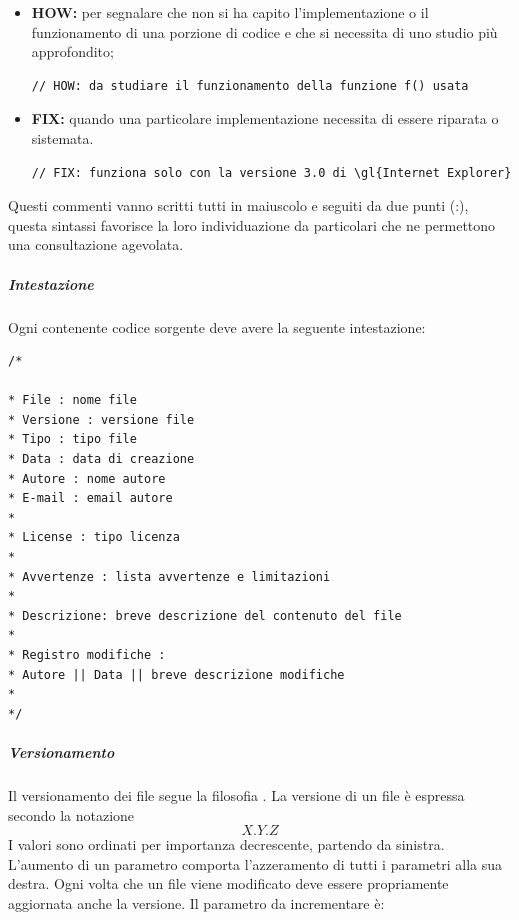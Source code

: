 \begin{itemize}
\begin{itemize}
				\item \textbf{HOW:} per segnalare che non si ha capito l'implementazione o il funzionamento di una porzione di codice e che si necessita di uno studio più approfondito;
				\begin{lstlisting}
// HOW: da studiare il funzionamento della funzione f() usata
				\end{lstlisting}
				
				\item \textbf{FIX:} quando una particolare implementazione necessita di essere riparata o sistemata.
				\begin{lstlisting}
// FIX: funziona solo con la versione 3.0 di \gl{Internet Explorer}
				\end{lstlisting}
			\end{itemize}
			Questi commenti vanno scritti tutti in maiuscolo e seguiti da due punti (:), questa sintassi favorisce la loro individuazione da particolari  che ne permettono una consultazione agevolata.
			
			\end{itemize}
			\subparagraph{Intestazione} \Spazio
			Ogni  contenente codice sorgente deve avere la seguente intestazione:
			\begin{lstlisting}
/*

* File : nome file
* Versione : versione file
* Tipo : tipo file
* Data : data di creazione
* Autore : nome autore 
* E-mail : email autore 
*
* License : tipo licenza				
*				
* Avvertenze : lista avvertenze e limitazioni
*
* Descrizione: breve descrizione del contenuto del file
*
* Registro modifiche :
* Autore || Data || breve descrizione modifiche
*
*/
			\end{lstlisting}
			\subparagraph{Versionamento} \Spazio
			Il versionamento dei file segue la filosofia . La versione di un file è espressa secondo la notazione $$X.Y.Z$$ I valori sono ordinati per importanza decrescente, partendo da sinistra. L'aumento di un parametro comporta l'azzeramento di tutti i parametri alla sua destra. Ogni volta che un file viene modificato deve essere propriamente aggiornata anche la versione. Il parametro da incrementare è:
